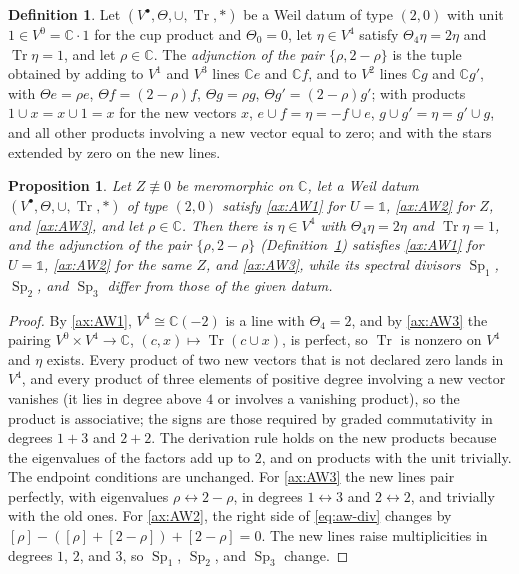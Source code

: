 \documentclass[11pt]{amsart}
\theoremstyle{plain}
\newtheorem{proposition}[theorem]{Proposition}
\theoremstyle{definition}
\newtheorem{definition}[theorem]{Definition}
\theoremstyle{remark}
\numberwithin{equation}{section}
\newcommand{\C}{\mathbb{C}}
\DeclareMathOperator{\Tr}{Tr}
\begin{document}
\begin{definition}\label{def:adjoin-pair}
Let $(V^\bullet,\Theta,\cup,\Tr,*)$ be a Weil datum of type $(2,0)$
with unit $1\in V^0=\C\cdot1$ for the cup product and $\Theta_0=0$,
let $\eta\in V^4$ satisfy
$\Theta_4\eta=2\eta$ and $\Tr\eta=1$, and let $\rho\in\C$. The
\emph{adjunction of the pair $\{\rho,2-\rho\}$} is the tuple obtained by
adding to $V^1$ and $V^3$ lines $\C e$ and $\C f$, and to $V^2$ lines
$\C g$ and $\C g'$, with $\Theta e=\rho e$, $\Theta f=(2-\rho)f$,
$\Theta g=\rho g$, $\Theta g'=(2-\rho)g'$; with products $1\cup x=x\cup
1=x$ for the new vectors $x$, $e\cup f=\eta=-f\cup e$,
$g\cup g'=\eta=g'\cup g$, and all other products involving a new vector
equal to zero; and with the stars extended by zero on the new lines.
\end{definition}

\begin{proposition}\label{prop:no-positivity-cancel}
Let $Z\not\equiv0$ be meromorphic on $\C$, let a Weil datum
$(V^\bullet,\Theta,\cup,\Tr,*)$ of type $(2,0)$ satisfy \ref{ax:AW1} for
$U=\mathbb 1$, \ref{ax:AW2} for $Z$, and \ref{ax:AW3}, and let
$\rho\in\C$. Then there is $\eta\in V^4$ with
$\Theta_4\eta=2\eta$ and $\Tr\eta=1$, and the adjunction of the pair
$\{\rho,2-\rho\}$ (Definition~\ref{def:adjoin-pair}) satisfies
\ref{ax:AW1} for $U=\mathbb 1$, \ref{ax:AW2} for the same $Z$, and
\ref{ax:AW3}, while its spectral divisors $\operatorname{Sp}_1$,
$\operatorname{Sp}_2$, and $\operatorname{Sp}_3$ differ from those of the
given datum.
\end{proposition}

\begin{proof}
By \ref{ax:AW1}, $V^4\cong\C(-2)$ is a line with $\Theta_4=2$, and by
\ref{ax:AW3} the pairing $V^0\times V^4\to\C$, $(c,x)\mapsto\Tr(c\cup
x)$, is perfect, so $\Tr$ is nonzero on $V^4$ and $\eta$ exists. Every
product of two new vectors that is not declared zero lands in $V^4$,
and every product of three elements of positive degree involving a new
vector vanishes (it lies in degree above $4$ or involves a vanishing
product), so the product is associative; the signs are those required
by graded commutativity in degrees $1+3$ and $2+2$. The derivation rule
holds on the new products because the eigenvalues of the factors add
up to $2$, and on products with the unit trivially. The endpoint
conditions are unchanged. For \ref{ax:AW3} the new lines pair perfectly,
with eigenvalues $\rho\leftrightarrow2-\rho$, in degrees
$1\leftrightarrow3$ and $2\leftrightarrow2$, and trivially with the old
ones. For \ref{ax:AW2}, the right side of \eqref{eq:aw-div} changes by
$[\rho]-([\rho]+[2-\rho])+[2-\rho]=0$. The new lines raise
multiplicities in degrees $1$, $2$, and $3$, so $\operatorname{Sp}_1$,
$\operatorname{Sp}_2$, and $\operatorname{Sp}_3$ change.
\end{proof}
\end{document}
